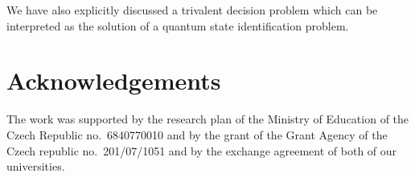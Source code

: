 \documentclass[pra,amsfonts,showpacs,showkeys,preprint]{revtex4}
\begin{document}
We have also explicitly discussed a trivalent decision problem which can be interpreted as the solution of a quantum
state identification problem.



\section *{Acknowledgements}


The work was supported by the research plan of the Ministry of Education of
the Czech Republic no.~6840770010 and by the grant of the Grant Agency of
the Czech republic no.~201/07/1051 and by the exchange agreement
of both of our universities.




%
\end{document}
